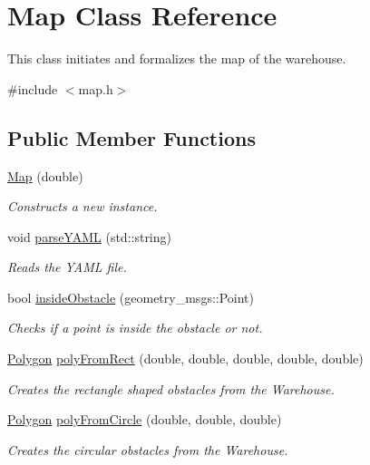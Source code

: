 \hypertarget{class_map}{}\section{Map Class Reference}
\label{class_map}


This class initiates and formalizes the map of the warehouse.  




{\ttfamily \#include $<$map.\+h$>$}

\subsection*{Public Member Functions}
\begin{DoxyCompactItemize}
\item 
\hyperlink{class_map_ad5cd5fdafc0b0d3a926953e516765ca5}{Map} (double)
\begin{DoxyCompactList}\small\item\em Constructs a new instance. \end{DoxyCompactList}\item 
void \hyperlink{class_map_acdd30d3fa51e3d444985845bc399c465}{parse\+Y\+A\+ML} (std\+::string)
\begin{DoxyCompactList}\small\item\em Reads the Y\+A\+ML file. \end{DoxyCompactList}\item 
bool \hyperlink{class_map_a6a0352043ce2a93a0a98e7050ef456fd}{inside\+Obstacle} (geometry\+\_\+msgs\+::\+Point)
\begin{DoxyCompactList}\small\item\em Checks if a point is inside the obstacle or not. \end{DoxyCompactList}\item 
\hyperlink{class_polygon}{Polygon} \hyperlink{class_map_aabf78e889bf59df6b06f0a63ccb144f9}{poly\+From\+Rect} (double, double, double, double, double)
\begin{DoxyCompactList}\small\item\em Creates the rectangle shaped obstacles from the Warehouse. \end{DoxyCompactList}\item 
\hyperlink{class_polygon}{Polygon} \hyperlink{class_map_add3430fc86a2dc8c423f470ddbc73736}{poly\+From\+Circle} (double, double, double)
\begin{DoxyCompactList}\small\item\em Creates the circular obstacles from the Warehouse. \end{DoxyCompactList}\item 

\end{DoxyCompactItemize}
